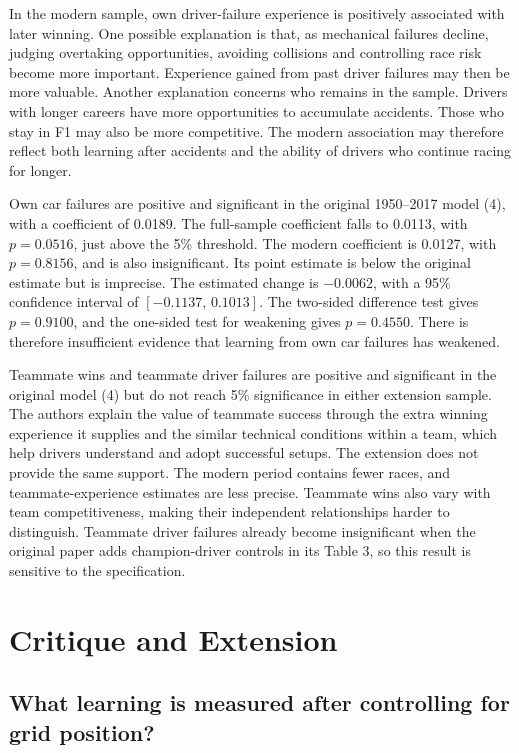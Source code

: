 \documentclass[11pt,letterpaper]{article}
\begin{document}
In the modern sample, own driver-failure experience is positively associated with later winning. One possible explanation is that, as mechanical failures decline, judging overtaking opportunities, avoiding collisions and controlling race risk become more important. Experience gained from past driver failures may then be more valuable. Another explanation concerns who remains in the sample. Drivers with longer careers have more opportunities to accumulate accidents. Those who stay in F1 may also be more competitive. The modern association may therefore reflect both learning after accidents and the ability of drivers who continue racing for longer.

Own car failures are positive and significant in the original 1950--2017 model (4), with a coefficient of 0.0189. The full-sample coefficient falls to 0.0113, with $p=0.0516$, just above the 5\% threshold. The modern coefficient is 0.0127, with $p=0.8156$, and is also insignificant. Its point estimate is below the original estimate but is imprecise. The estimated change is $-0.0062$, with a 95\% confidence interval of $[-0.1137,\,0.1013]$. The two-sided difference test gives $p=0.9100$, and the one-sided test for weakening gives $p=0.4550$. There is therefore insufficient evidence that learning from own car failures has weakened.

Teammate wins and teammate driver failures are positive and significant in the original model (4) but do not reach 5\% significance in either extension sample. The authors explain the value of teammate success through the extra winning experience it supplies and the similar technical conditions within a team, which help drivers understand and adopt successful setups. The extension does not provide the same support. The modern period contains fewer races, and teammate-experience estimates are less precise. Teammate wins also vary with team competitiveness, making their independent relationships harder to distinguish. Teammate driver failures already become insignificant when the original paper adds champion-driver controls in its Table 3, so this result is sensitive to the specification.


\FloatBarrier

\section{Critique and Extension}

\subsection*{What learning is measured after controlling for grid position?}
\end{document}
